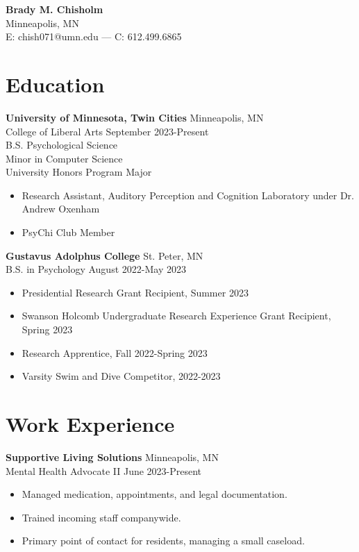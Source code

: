 \documentclass[10pt]{article}
\begin{document}
\begin{center}
    \textbf{\Large Brady M. Chisholm} \\
    Minneapolis, MN \\
    E: chish071@umn.edu \quad — \quad C: 612.499.6865
\end{center}

\vspace{-0.1in}  %

\section*{Education}
\vspace{-0.02in}

\textbf{University of Minnesota, Twin Cities} \hfill Minneapolis, MN \\
College of Liberal Arts \hfill September 2023-Present \\
B.S. Psychological Science \\
Minor in Computer Science \\
University Honors Program Major
\begin{itemize}
    \item Research Assistant, Auditory Perception and Cognition Laboratory under Dr. Andrew Oxenham
    \item PsyChi Club Member
\end{itemize}

\textbf{Gustavus Adolphus College} \hfill St. Peter, MN \\
B.S. in Psychology \hfill August 2022-May 2023
\begin{itemize}
    \item Presidential Research Grant Recipient, Summer 2023
    \item Swanson Holcomb Undergraduate Research Experience Grant Recipient, Spring 2023
    \item Research Apprentice, Fall 2022-Spring 2023
    \item Varsity Swim and Dive Competitor, 2022-2023
\end{itemize}

\section*{Work Experience}
\vspace{-0.05in}

\textbf{Supportive Living Solutions} \hfill Minneapolis, MN \\
Mental Health Advocate II \hfill June 2023-Present
\begin{itemize}
    \item Managed medication, appointments, and legal documentation.
    \item Trained incoming staff companywide.
    \item Primary point of contact for residents, managing a small caseload.
\end{itemize}
\end{document}
